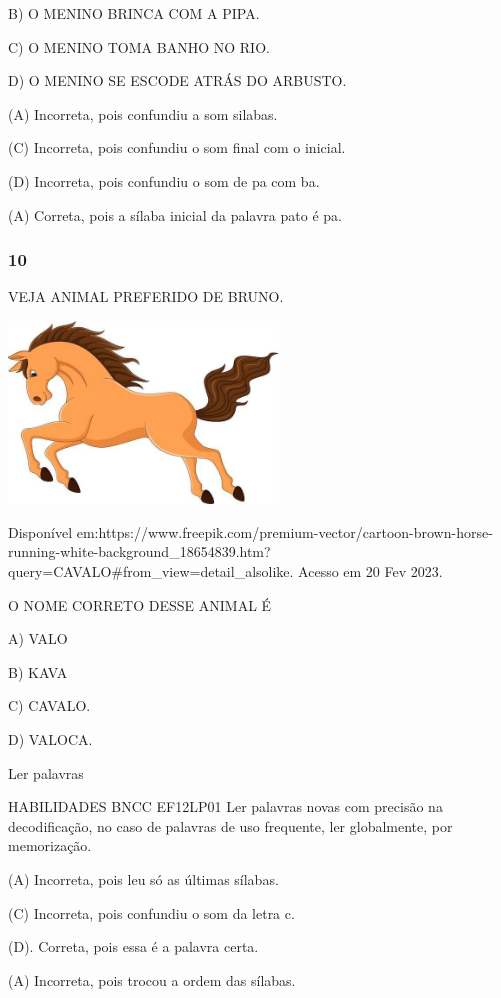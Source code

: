 \begin{escola}
B) O MENINO BRINCA COM A PIPA.

C) O MENINO TOMA BANHO NO RIO.

D) O MENINO SE ESCODE ATRÁS DO ARBUSTO.

(A) Incorreta, pois confundiu a som silabas.

(C) Incorreta, pois confundiu o som final com o inicial.

(D) Incorreta, pois confundiu o som de pa com ba.

(A) Correta, pois a sílaba inicial da palavra pato é
pa.\protect\hypertarget{_heading=h.qmyrjsh4y5fg}{}{}

\subsubsection{10}\label{section-66}

VEJA ANIMAL PREFERIDO DE BRUNO.

\includegraphics[width=2.82210in,height=1.90975in]{media/image234.jpg}

Disponível
em:https://www.freepik.com/premium-vector/cartoon-brown-horse-running-white-background\_18654839.htm?query=CAVALO\#from\_view=detail\_alsolike.
Acesso em 20 Fev 2023.

O NOME CORRETO DESSE ANIMAL É

A) VALO

B) KAVA

C) CAVALO.

D) VALOCA.

Ler palavras

HABILIDADES BNCC EF12LP01 Ler palavras novas com precisão na
decodificação, no caso de palavras de uso frequente, ler globalmente,
por memorização.

(A) Incorreta, pois leu só as últimas sílabas.

(C) Incorreta, pois confundiu o som da letra c.

(D). Correta, pois essa é a palavra certa.

(A) Incorreta, pois trocou a ordem das
sílabas.\protect\hypertarget{_heading=h.oxa1c0ljwovb}{}{}


\end{escola}
